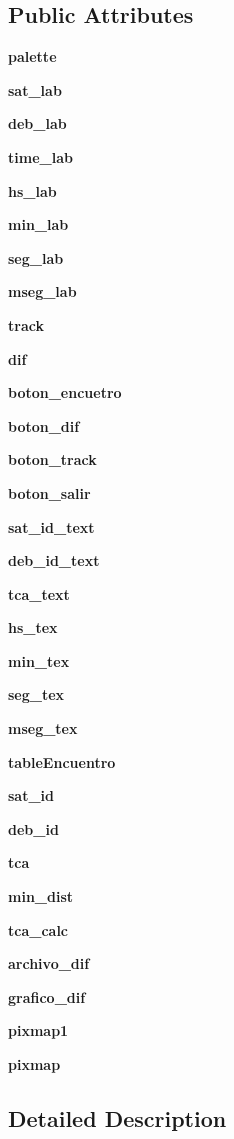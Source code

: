 \subsection*{\-Public \-Attributes}
\begin{DoxyCompactItemize}
\item 
{\bf palette}
\item 
{\bf sat\-\_\-lab}
\item 
{\bf deb\-\_\-lab}
\item 
{\bf time\-\_\-lab}
\item 
{\bf hs\-\_\-lab}
\item 
{\bf min\-\_\-lab}
\item 
{\bf seg\-\_\-lab}
\item 
{\bf mseg\-\_\-lab}
\item 
{\bf track}
\item 
{\bf dif}
\item 
{\bf boton\-\_\-encuetro}
\item 
{\bf boton\-\_\-dif}
\item 
{\bf boton\-\_\-track}
\item 
{\bf boton\-\_\-salir}
\item 
{\bf sat\-\_\-id\-\_\-text}
\item 
{\bf deb\-\_\-id\-\_\-text}
\item 
{\bf tca\-\_\-text}
\item 
{\bf hs\-\_\-tex}
\item 
{\bf min\-\_\-tex}
\item 
{\bf seg\-\_\-tex}
\item 
{\bf mseg\-\_\-tex}
\item 
{\bf table\-Encuentro}
\item 
{\bf sat\-\_\-id}
\item 
{\bf deb\-\_\-id}
\item 
{\bf tca}
\item 
{\bf min\-\_\-dist}
\item 
{\bf tca\-\_\-calc}
\item 
{\bf archivo\-\_\-dif}
\item 
{\bf grafico\-\_\-dif}
\item 
{\bf pixmap1}
\item 
{\bf pixmap}
\end{DoxyCompactItemize}


\subsection{\-Detailed \-Description}


